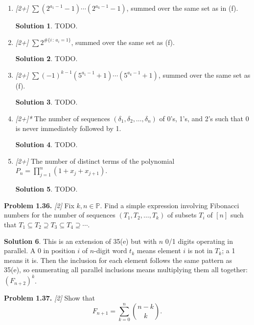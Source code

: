 \documentclass[11pt]{article}
\theoremstyle{definition}
\newtheorem*{solution}{Solution}
\newcounter{probnum}
\newcommand{\problem}[1]{%
  \setcounter{probnum}{#1}%
  \medskip
  \noindent\textbf{Problem 1.#1.}\quad
}
\begin{document}
\begin{enumerate}[label=(\alph*)]
  \item \textit{[2+]} $\sum (2^{a_1-1}-1)\cdots(2^{a_k-1}-1)$, summed over the same
    set as in (f).
    \begin{solution}
    TODO\@.
    \end{solution}

  \item \textit{[2+]} $\sum 2^{\#\{i\,:\,a_i=1\}}$, summed over the same set as (f).
    \begin{solution}
    TODO\@.
    \end{solution}

  \item \textit{[2+]} $\sum (-1)^{k-1}(5^{a_1-1}+1)\cdots(5^{a_k-1}+1)$, summed
    over the same set as (f).
    \begin{solution}
    TODO\@.
    \end{solution}

  \item \textit{[2+]*} The number of sequences $(\delta_1, \delta_2, \ldots,
    \delta_n)$ of 0's, 1's, and 2's such that 0 is never immediately followed by 1.
    \begin{solution}
    TODO\@.
    \end{solution}

  \item \textit{[2+]} The number of distinct terms of the polynomial
    $P_n = \prod_{j=1}^{n}(1 + x_j + x_{j+1})$.
    \begin{solution}
    TODO\@.
    \end{solution}
\end{enumerate}

\problem{36} \textit{[2]}
Fix $k, n \in \mathbb{P}$. Find a simple expression involving Fibonacci numbers for
the number of sequences $(T_1, T_2, \ldots, T_k)$ of subsets $T_i$ of $[n]$ such
that $T_1 \subseteq T_2 \supseteq T_3 \subseteq T_4 \supseteq \cdots$.

\begin{solution}
This is an extension of 35(e) but with $n$ 0/1 digits operating in parallel. A 0 in
position $i$ of $n$-digit word $t_k$ means element $i$ is not in $T_k$; a 1 means it
is. Then the inclusion for each element follows the same pattern as 35(e), so
enumerating all parallel inclusions means multiplying them all together: $(F_{n+2})^k$.
\end{solution}

\problem{37} \textit{[2]}
Show that
\[
  F_{n+1} = \sum_{k=0}^{n}\binom{n-k}{k}. \tag{1.122}
\]
\end{document}
